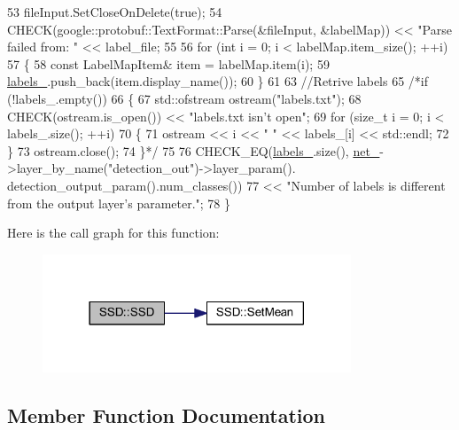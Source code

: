 \begin{DoxyCode}
53     fileInput.SetCloseOnDelete(\textcolor{keyword}{true});
54     CHECK(google::protobuf::TextFormat::Parse(&fileInput, &labelMap)) << \textcolor{stringliteral}{"Parse failed from: "} << 
      label\_file;
55     
56     \textcolor{keywordflow}{for} (\textcolor{keywordtype}{int} i = 0; i < labelMap.item\_size(); ++i)
57     \{
58         \textcolor{keyword}{const} LabelMapItem& item = labelMap.item(i);
59         \mbox{\hyperlink{class_s_s_d_a1c4d34f2dda5d4ca2dfabbebff7a0ddb}{labels\_}}.push\_back(item.display\_name());
60     \}
61 
63     \textcolor{comment}{//Retrive labels}
65 \textcolor{comment}{}    \textcolor{comment}{/*if (!labels\_.empty())}
66 \textcolor{comment}{    \{}
67 \textcolor{comment}{        std::ofstream ostream("labels.txt");}
68 \textcolor{comment}{        CHECK(ostream.is\_open()) << "labels.txt isn't open";}
69 \textcolor{comment}{        for (size\_t i = 0; i < labels\_.size(); ++i)}
70 \textcolor{comment}{        \{}
71 \textcolor{comment}{            ostream << i << " " << labels\_[i] << std::endl;}
72 \textcolor{comment}{        \}}
73 \textcolor{comment}{        ostream.close();}
74 \textcolor{comment}{    \}*/}
75 
76     CHECK\_EQ(\mbox{\hyperlink{class_s_s_d_a1c4d34f2dda5d4ca2dfabbebff7a0ddb}{labels\_}}.size(), \mbox{\hyperlink{class_s_s_d_a9b70501b85252c3135030e5c6c1e7117}{net\_}}->layer\_by\_name(\textcolor{stringliteral}{"detection\_out"})->layer\_param().
      detection\_output\_param().num\_classes())
77         << \textcolor{stringliteral}{"Number of labels is different from the output layer's parameter."};
78 \}
\end{DoxyCode}
Here is the call graph for this function\+:\nopagebreak
\begin{figure}[H]
\begin{center}
\leavevmode
\includegraphics[width=261pt]{class_s_s_d_ab89e65721f203d52f63b5e5d833d671c_cgraph}
\end{center}
\end{figure}


\subsection{Member Function Documentation}
\mbox{\label{class_s_s_d_a35235278ff6d18ee494b2ccce3303c67}} 
